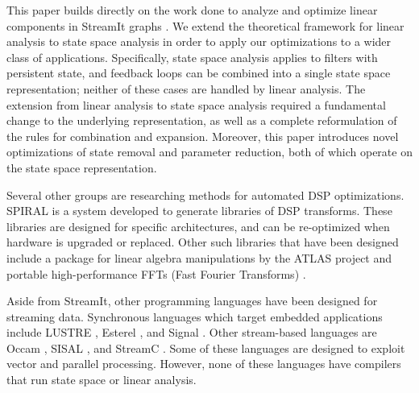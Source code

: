 \label{sec:related}

This paper builds directly on the work done to analyze and optimize
linear components in StreamIt graphs \cite{Lamb}. We extend the
theoretical framework for linear analysis to state space analysis in
order to apply our optimizations to a wider class of applications.
Specifically, state space analysis applies to filters with persistent
state, and feedback loops can be combined into a single state space
representation; neither of these cases are handled by linear analysis.
The extension from linear analysis to state space analysis required a
fundamental change to the underlying representation, as well as a
complete reformulation of the rules for combination and expansion.
Moreover, this paper introduces novel optimizations of state removal
and parameter reduction, both of which operate on the state space
representation.

Several other groups are researching methods for automated DSP
optimizations. SPIRAL \cite{Spiral} is a system developed to generate
libraries of DSP transforms. These libraries are designed for specific
architectures, and can be re-optimized when hardware is upgraded or
replaced. Other such libraries that have been designed include a
package for linear algebra manipulations by the ATLAS project
\cite{Atlas} and portable high-performance FFTs (Fast Fourier
Transforms) \cite{fftw}.

Aside from StreamIt, other programming languages have been designed
for streaming data. Synchronous languages which target embedded
applications include LUSTRE \cite{Lustre}, Esterel \cite{Esterel}, and
Signal \cite{Signal}. Other stream-based languages are Occam
\cite{Occam}, SISAL \cite{sisal}, and StreamC \cite{streamc}.  Some of
these languages are designed to exploit vector and parallel
processing. However, none of these languages have compilers that run
state space or linear analysis.
